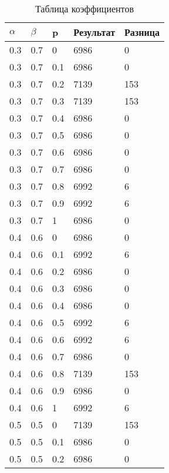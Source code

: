 \begin{table}[ht]
	\centering
	\caption{Таблица коэффициентов}
	\label{table:ref1}
	\begin{tabular}{ | l | l | l | l | l |}
		\hline
		$\alpha$ & $\beta$ & p   & Результат & Разница \\
		\hline
		0.3      & 0.7     & 0   & 6986      & 0       \\
		0.3      & 0.7     & 0.1 & 6986      & 0       \\
		0.3      & 0.7     & 0.2 & 7139      & 153     \\
		0.3      & 0.7     & 0.3 & 7139      & 153     \\
		0.3      & 0.7     & 0.4 & 6986      & 0       \\
		0.3      & 0.7     & 0.5 & 6986      & 0       \\
		0.3      & 0.7     & 0.6 & 6986      & 0       \\
		0.3      & 0.7     & 0.7 & 6986      & 0       \\
		0.3      & 0.7     & 0.8 & 6992      & 6       \\
		0.3      & 0.7     & 0.9 & 6992      & 6       \\
		0.3      & 0.7     & 1   & 6986      & 0       \\
		0.4      & 0.6     & 0   & 6986      & 0       \\
		0.4      & 0.6     & 0.1 & 6992      & 6       \\
		0.4      & 0.6     & 0.2 & 6986      & 0       \\
		0.4      & 0.6     & 0.3 & 6986      & 0       \\
		0.4      & 0.6     & 0.4 & 6986      & 0       \\
		0.4      & 0.6     & 0.5 & 6992      & 6       \\
		0.4      & 0.6     & 0.6 & 6992      & 6       \\
		0.4      & 0.6     & 0.7 & 6986      & 0       \\
		0.4      & 0.6     & 0.8 & 7139      & 153     \\
		0.4      & 0.6     & 0.9 & 6986      & 0       \\
		0.4      & 0.6     & 1   & 6992      & 6       \\
		0.5      & 0.5     & 0   & 7139      & 153     \\
		0.5      & 0.5     & 0.1 & 6986      & 0       \\
		0.5      & 0.5     & 0.2 & 6986      & 0       \\

\end{tabular}
\end{table}
